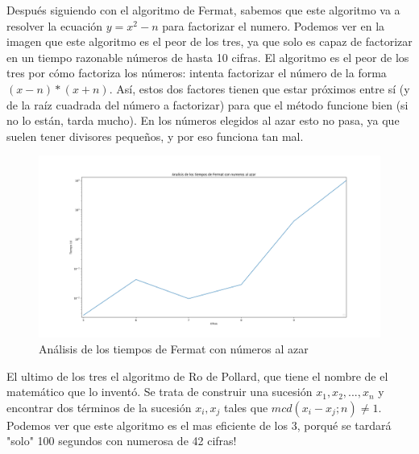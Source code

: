 \documentclass{article}
\begin{document}
    \newpage

     Después siguiendo con el algoritmo de Fermat, sabemos que este algoritmo va a resolver la ecuación \begin{math} y = x ^{2} - n \end{math} para factorizar el numero. Podemos ver en la imagen que este algoritmo es el peor de los tres, ya que solo es capaz de factorizar en un tiempo razonable números de hasta 10 cifras. El algoritmo es el peor de los tres por cómo factoriza los números: intenta factorizar el número de la forma \begin{math} (x-n)*(x+n)\end{math}. Así, estos dos factores tienen que estar próximos entre sí (y de la raíz cuadrada del número a factorizar) para que el método funcione bien (si no lo están, tarda mucho). En los números elegidos al azar esto no pasa, ya que suelen tener divisores pequeños, y por eso funciona tan mal.



    \begin{figure}[ht!]
        \centering
        \includegraphics[scale=0.3]{Figure_3}
        \caption{Análisis de los tiempos de Fermat con números al azar}
        \label{fig:Figure_3}
    \end{figure}

    \newpage


    El ultimo de los tres el algoritmo de Ro de Pollard, que tiene el nombre de el matemático que lo inventó. Se trata de construir una sucesión
    \begin{math} x_{1}, x_{2}, ..., x_{n} \end{math} y encontrar dos términos de la sucesión
    \begin{math}  x_{i}, x_{j} \end{math} tales que \begin{math} mcd(x_{i} - x_{j} ; n) \neq 1. \end{math} Podemos ver que este algoritmo es el mas eficiente de los 3, porqué se tardará "solo" 100 segundos con numerosa de 42 cifras!
\end{document}

